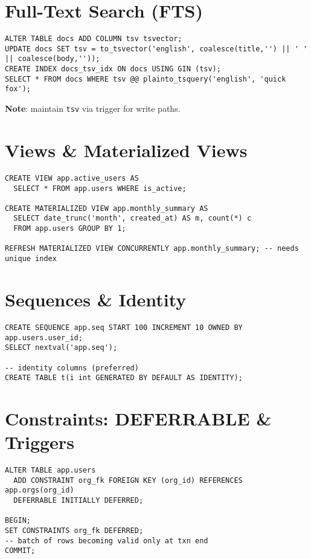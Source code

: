 \documentclass[10pt]{article}
\begin{document}
\section{Full-Text Search (FTS)}
\begin{lstlisting}[style=psql]
ALTER TABLE docs ADD COLUMN tsv tsvector;
UPDATE docs SET tsv = to_tsvector('english', coalesce(title,'') || ' ' || coalesce(body,''));
CREATE INDEX docs_tsv_idx ON docs USING GIN (tsv);
SELECT * FROM docs WHERE tsv @@ plainto_tsquery('english', 'quick fox');
\end{lstlisting}
\textbf{Note}: maintain \texttt{tsv} via trigger for write paths.

\section{Views \& Materialized Views}
\begin{lstlisting}[style=psql]
CREATE VIEW app.active_users AS
  SELECT * FROM app.users WHERE is_active;

CREATE MATERIALIZED VIEW app.monthly_summary AS
  SELECT date_trunc('month', created_at) AS m, count(*) c
  FROM app.users GROUP BY 1;

REFRESH MATERIALIZED VIEW CONCURRENTLY app.monthly_summary; -- needs unique index
\end{lstlisting}

\section{Sequences \& Identity}
\begin{lstlisting}[style=psql]
CREATE SEQUENCE app.seq START 100 INCREMENT 10 OWNED BY app.users.user_id;
SELECT nextval('app.seq');

-- identity columns (preferred)
CREATE TABLE t(i int GENERATED BY DEFAULT AS IDENTITY);
\end{lstlisting}

\section{Constraints: DEFERRABLE \& Triggers}
\begin{lstlisting}[style=psql]
ALTER TABLE app.users
  ADD CONSTRAINT org_fk FOREIGN KEY (org_id) REFERENCES app.orgs(org_id)
  DEFERRABLE INITIALLY DEFERRED;

BEGIN;
SET CONSTRAINTS org_fk DEFERRED;
-- batch of rows becoming valid only at txn end
COMMIT;
\end{lstlisting}
\end{document}
